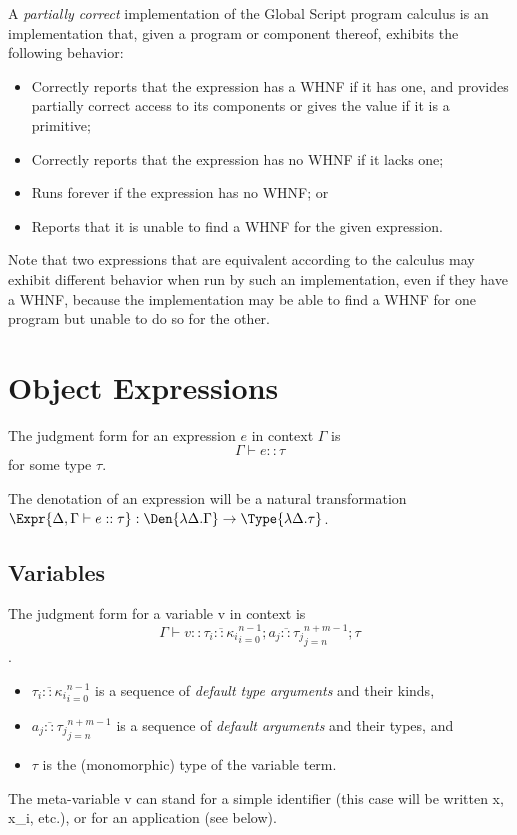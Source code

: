 \documentclass{report}
\newcommand\sequent\vdash
\newcommand\defn[1]{\emph{#1}}
\begin{document}
A \defn{partially correct} implementation of the Global Script program calculus is an implementation that, given a program or component thereof,
exhibits the following behavior:
\begin{itemize}
  \item Correctly reports that the expression has a WHNF if it has one, and provides partially correct access to its components or gives the value if it is a primitive;
  \item Correctly reports that the expression has no WHNF if it lacks one;
  \item Runs forever if the expression has no WHNF; or
  \item Reports that it is unable to find a WHNF for the given expression.
\end{itemize}
Note that two expressions that are equivalent according to the calculus may exhibit different behavior when run by such an implementation,
even if they have a WHNF,
because the implementation may be able to find a WHNF for one program but unable to do so for the other.

\chapter{Object Expressions}

The judgment form for an expression $e$ in context $\Gamma$ is
\begin{equation}
    \Gamma \sequent e :: \tau
\end{equation}
for some type $\tau$.

The denotation of an expression will be a natural transformation $\Expr{\Delta, \Gamma \sequent e :: \tau} : \Den{\lambda\Delta.\Gamma} \to \Type{\lambda\Delta.\tau}$.

\section{Variables}
\label{sec:variables}

The judgment form for a variable \<v\> in context \<\Gamma\> is
\begin{equation}\label{eqn:var-judgment}
    \Gamma \sequent v :: \overline{\tau_i :: \kappa_i}_{i=0}^{n-1}; \overline{a_j :: \tau_j}_{j=n}^{n+m-1}; \tau
\end{equation}.
\begin{itemize}
    \item $\overline{\tau_i :: \kappa_i}_{i=0}^{n-1}$ is a sequence of \defn{default type arguments} and their kinds,
    \item $\overline{a_j :: \tau_j}_{j=n}^{n+m-1}$ is a sequence of \defn{default arguments} and their types, and
    \item $\tau$ is the (monomorphic) type of the variable term.
\end{itemize}
The meta-variable \<v\> can stand for a simple identifier (this case will be written \<x\>, \<x_i\>, etc.), or for an application (see below).
\end{document}
